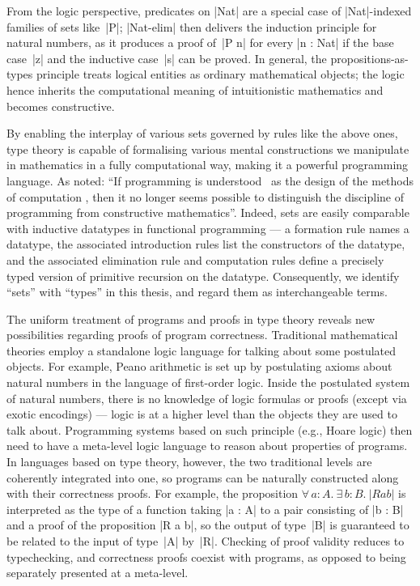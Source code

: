 \begin{center}
  
 \DP
\end{center}
From the logic perspective, predicates on |Nat| are a special case of |Nat|-indexed families of sets like~|P|; |Nat-elim| then delivers the induction principle for natural numbers, as it produces a proof of~|P n| for every |n : Nat| if the base case~|z| and the inductive case~|s| can be proved.
In general, the propositions-as-types principle treats logical entities as ordinary mathematical objects; the logic hence inherits the computational meaning of intuitionistic mathematics and becomes constructive.

By enabling the interplay of various sets governed by rules like the above ones, type theory is capable of formalising various mental constructions we manipulate in mathematics in a fully computational way, making it a powerful programming language.
As \citet{ML-constructive-math-programming} noted: ``If programming is understood \omission\ as the design of the methods of computation \omission, then it no longer seems possible to distinguish the discipline of programming from constructive mathematics''.
Indeed, sets are easily comparable with inductive datatypes in functional programming --- a formation rule names a datatype, the associated introduction rules list the constructors of the datatype, and the associated elimination rule and computation rules define a precisely typed version of primitive recursion on the datatype.
Consequently, we identify ``sets'' with ``types'' in this thesis, and regard them as interchangeable terms.

The uniform treatment of programs and proofs in type theory reveals new possibilities regarding proofs of program correctness.
Traditional mathematical theories employ a standalone logic language for talking about some postulated objects.
For example, Peano arithmetic is set up by postulating axioms about natural numbers in the language of first-order logic.
Inside the postulated system of natural numbers, there is no knowledge of logic formulas or proofs (except via exotic encodings) --- logic is at a higher level than the objects they are used to talk about.
Programming systems based on such principle (e.g., Hoare logic) then need to have a meta-level logic language to reason about properties of programs.
In  languages based on type theory, however, the two traditional levels are coherently integrated into one, so programs can be naturally constructed along with their correctness proofs.
For example, the proposition $\forall\,a : A.~\exists\,b : B.~|R a b|$ is interpreted as the type of a function taking |a : A| to a pair consisting of |b : B| and a proof of the proposition |R a b|, so the output of type~|B| is guaranteed to be related to the input of type~|A| by~|R|.
Checking of proof validity reduces to typechecking, and correctness proofs coexist with programs, as opposed to being separately presented at a meta-level.

